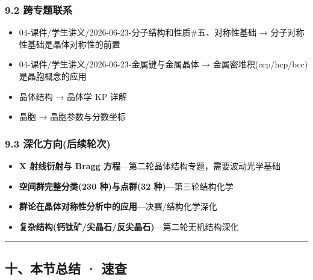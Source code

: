 \subsubsection{9.2 跨专题联系}\label{ux8de8ux4e13ux9898ux8054ux7cfb}

\begin{itemize}
\tightlist
\item
  04-课件/学生讲义/2026-06-23-分子结构和性质\#五、对称性基础 → 分子对称性基础是晶体对称性的前置
\item
  04-课件/学生讲义/2026-06-23-金属键与金属晶体 → 金属密堆积(ccp/hcp/bcc)是晶胞概念的应用
\item
  晶体结构 → 晶体学 KP 详解
\item
  晶胞 → 晶胞参数与分数坐标
\end{itemize}

\subsubsection{9.3 深化方向(后续轮次)}\label{ux6df1ux5316ux65b9ux5411ux540eux7eedux8f6eux6b21}

\begin{itemize}
\tightlist
\item
  \textbf{X 射线衍射与 Bragg 方程}---第二轮晶体结构专题，需要波动光学基础
\item
  \textbf{空间群完整分类(230 种)与点群(32 种)}---第三轮结构化学
\item
  \textbf{群论在晶体对称性分析中的应用}---决赛/结构化学深化
\item
  \textbf{复杂结构(钙钛矿/尖晶石/反尖晶石)}---第二轮无机结构深化
\end{itemize}

\begin{center}\rule{0.5\linewidth}{0.5pt}\end{center}

\subsection{十、本节总结 · 速查}\label{ux5341ux672cux8282ux603bux7ed3-ux901fux67e5}

